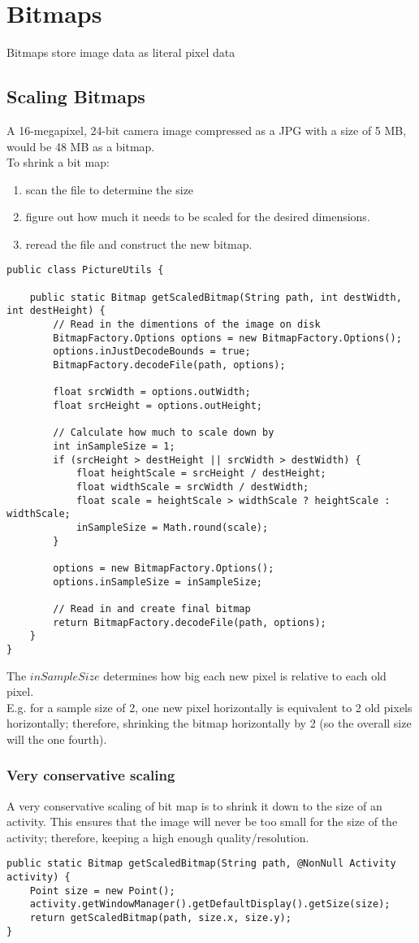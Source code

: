 \documentclass[]{article}
\begin{document}
\section{Bitmaps}
Bitmaps store image data as literal pixel data
\subsection{Scaling Bitmaps}
A 16-megapixel, 24-bit camera image compressed as a JPG with a size of 5 MB, would be 48 MB as a bitmap.
\\
To shrink a bit map:
\begin{enumerate}
	\item scan the file to determine the size
	\item figure out how much it needs to be scaled for the desired dimensions.
	\item reread the file and construct the new bitmap.
\end{enumerate}
\begin{lstlisting}
public class PictureUtils {

	public static Bitmap getScaledBitmap(String path, int destWidth, int destHeight) {
		// Read in the dimentions of the image on disk
		BitmapFactory.Options options = new BitmapFactory.Options();
		options.inJustDecodeBounds = true;
		BitmapFactory.decodeFile(path, options);

		float srcWidth = options.outWidth;
		float srcHeight = options.outHeight;

		// Calculate how much to scale down by
		int inSampleSize = 1;
		if (srcHeight > destHeight || srcWidth > destWidth) {
			float heightScale = srcHeight / destHeight;
			float widthScale = srcWidth / destWidth;
			float scale = heightScale > widthScale ? heightScale : widthScale;
			inSampleSize = Math.round(scale);
		}

		options = new BitmapFactory.Options();
		options.inSampleSize = inSampleSize;

		// Read in and create final bitmap
		return BitmapFactory.decodeFile(path, options);
	}
}
\end{lstlisting}
The $inSampleSize$ determines how big each new pixel is relative to each old pixel.
\\
E.g. for a sample size of 2, one new pixel horizontally is equivalent to 2 old pixels horizontally; therefore, shrinking the bitmap horizontally by 2 (so the overall size will the one fourth).
\subsubsection{Very conservative scaling}
A very conservative scaling of bit map is to shrink it down to the size of an activity.  This ensures that the image will never be too small for the size of the activity; therefore, keeping a high enough quality/resolution.
\begin{lstlisting}
public static Bitmap getScaledBitmap(String path, @NonNull Activity activity) {
	Point size = new Point();
	activity.getWindowManager().getDefaultDisplay().getSize(size);
	return getScaledBitmap(path, size.x, size.y);
}
\end{lstlisting}
\end{document}
